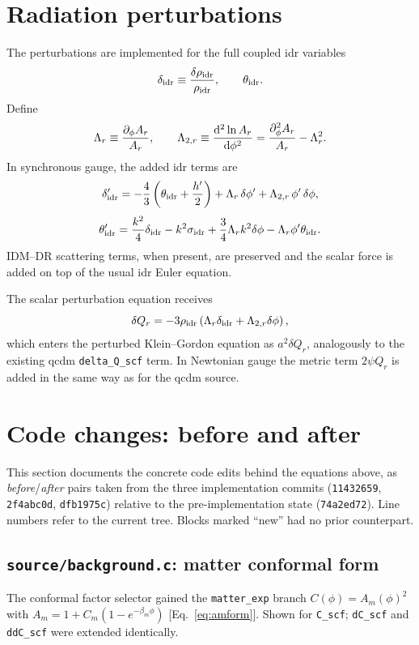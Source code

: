 \documentclass[11pt,a4paper,english,twoside]{article}
\def\beq{\begin{equation}}
\def\eeq{\end{equation}}
\def\del{\partial}
\def\d{{\rm d}}
\def\Ar{A_r}
\begin{document}
\section{Radiation perturbations}

The perturbations are implemented for the full coupled idr variables
\beq
\delta_{\rm idr}\equiv\frac{\delta\rho_{\rm idr}}{\rho_{\rm idr}},\qquad
\theta_{\rm idr}.
\eeq
Define
\beq
\Lambda_r\equiv\frac{\del_\phi\Ar}{\Ar},\qquad
\Lambda_{2,r}\equiv\frac{\d^2\ln\Ar}{\d\phi^2}
=\frac{\del^2_\phi\Ar}{\Ar}-\Lambda_r^2.
\label{eq:lambdar}
\eeq
In synchronous gauge, the added idr terms are
\beq
\delta_{\rm idr}' =
-\frac43\left(\theta_{\rm idr}+\frac{h'}{2}\right)
+\Lambda_r\,\delta\phi'
+\Lambda_{2,r}\,\phi'\,\delta\phi,
\label{eq:deltaidr}
\eeq
\beq
\theta_{\rm idr}' =
\frac{k^2}{4}\delta_{\rm idr}
-k^2\sigma_{\rm idr}
+\frac34\Lambda_r k^2\delta\phi
-\Lambda_r\phi'\theta_{\rm idr}.
\label{eq:thetaidr}
\eeq
IDM--DR scattering terms, when present, are preserved and the scalar force is added
on top of the usual idr Euler equation.

The scalar perturbation equation receives
\beq
\delta Q_r=-3\rho_{\rm idr}
\left(\Lambda_r\delta_{\rm idr}+\Lambda_{2,r}\delta\phi\right),
\label{eq:deltaqr}
\eeq
which enters the perturbed Klein--Gordon equation as $a^2\delta Q_r$, analogously to
the existing qcdm \texttt{delta\_Q\_scf} term.  In Newtonian gauge the metric term
$2\psi Q_r$ is added in the same way as for the qcdm source.

\section{Code changes: before and after}
\label{sec:beforeafter}

This section documents the concrete code edits behind the equations above, as
\emph{before}/\emph{after} pairs taken from the three implementation commits
(\texttt{11432659}, \texttt{2f4abc0d}, \texttt{dfb1975c}) relative to the
pre-implementation state (\texttt{74a2ed72}).  Line numbers refer to the current
tree.  Blocks marked ``new'' had no prior counterpart.

\subsection{\texttt{source/background.c}: matter conformal form}

The conformal factor selector gained the \texttt{matter\_exp} branch
$C(\phi)=A_m(\phi)^2$ with $A_m=1+C_m(1-e^{-\beta_m\phi})$
[Eq.~\eqref{eq:amform}].  Shown for \texttt{C\_scf}; \texttt{dC\_scf} and
\texttt{ddC\_scf} were extended identically.
\end{document}

